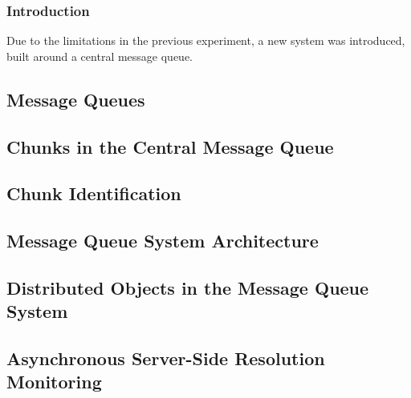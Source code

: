 \subsubsection{Introduction}\label{mqintro}

Due to the limitations in the previous experiment, a new system was introduced, built around a central message queue.

\subsection{Message Queues}\label{central-message-queue}

\subsection{Chunks in the Central Message Queue}

\subsection{Chunk Identification}

\subsection{Message Queue System Architecture}

\subsection{Distributed Objects in the Message Queue System}

\subsection{Asynchronous Server-Side Resolution Monitoring}

